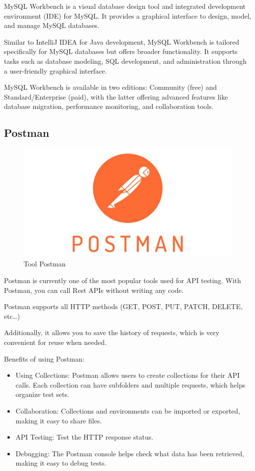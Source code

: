 \documentclass[../Main.tex]{subfiles}
\begin{document}
MySQL Workbench is a visual database design tool and integrated development environment (IDE) for MySQL.
It provides a graphical interface to design, model, and manage MySQL databases.

Similar to IntelliJ IDEA for Java development, MySQL Workbench is tailored specifically for MySQL databases but offers broader functionality.
It supports tasks such as database modeling, SQL development, and administration through a user-friendly graphical interface.

MySQL Workbench is available in two editions: Community (free) and Standard/Enterprise (paid), with the latter offering advanced features like database migration, performance monitoring, and collaboration tools.

\subsection{Postman}

\begin{figure}[H]
    \centering
    \includegraphics[width=\textwidth]{Figure/Picture6.png}
    \caption{Tool Postman}
    \label{fig:postman}
\end{figure}

Postman is currently one of the most popular tools used for API testing.
With Postman, you can call Rest APIs without writing any code.

Postman supports all HTTP methods (GET, POST, PUT, PATCH, DELETE, etc\dots)

Additionally, it allows you to save the history of requests, which is very convenient for reuse when needed.

Benefits of using Postman:

\begin{itemize}
    \item Using Collections: Postman allows users to create collections for their API calls.
          Each collection can have subfolders and multiple requests, which helps organize test sets.
    \item Collaboration: Collections and environments can be imported or exported, making it easy to share files.
    \item API Testing: Test the HTTP response status.
    \item Debugging: The Postman console helps check what data has been retrieved, making it easy to debug tests.
\end{itemize}
\end{document}
